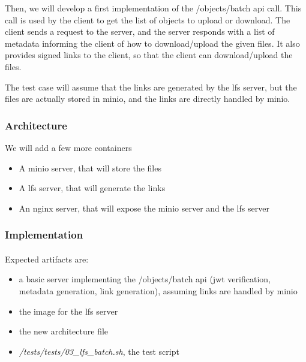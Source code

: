 Then, we will develop a first implementation of the /objects/batch api call. This call is used by the client to get the list of objects to upload or download. The client sends a request to the server, and the server responds with a list of metadata informing the client of how to download/upload the given files. It also provides signed links to the client, so that the client can download/upload the files.

The test case will assume that the links are generated by the lfs server, but the files are actually stored in minio, and the links are directly handled by minio. 

\subsubsection{Architecture}
We will add a few more containers

\begin{itemize}
    \item A minio server, that will store the files
    \item A lfs server, that will generate the links
    \item An nginx server, that will expose the minio server and the lfs server
\end{itemize}

\subsubsection{Implementation}

\paragraph{}
Expected artifacts are:

\begin{itemize}
    \item a basic server implementing the /objects/batch api  (jwt verification, metadata generation, link generation), assuming links are handled by minio
    \item the image for the lfs server
    \item the new architecture file
    \item \textit{/tests/tests/03\_lfs\_batch.sh}, the test script
\end{itemize}
